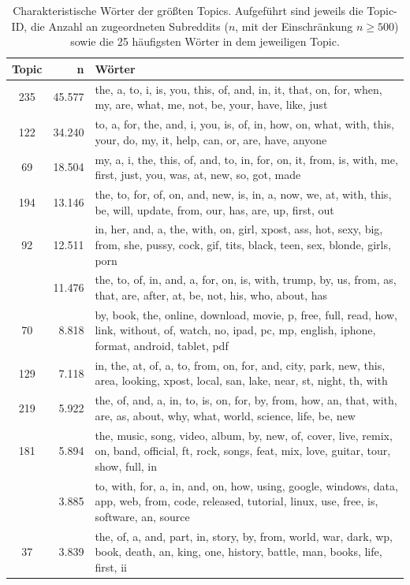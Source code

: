\documentclass[11pt,a4paper,twoside]{article}
\begin{document}
\begin{longtable}[t]{cr >{\raggedright\arraybackslash}p{\textwidth}}
\caption{\label{tab:app-top-words-tab}Charakteristische Wörter der größten Topics.
Aufgeführt sind jeweils die Topic-ID, die Anzahl an zugeordneten
Subreddits (\(n\), mit der Einschränkung \(n \ge 500\)) sowie die 25
häufigsten Wörter in dem jeweiligen Topic.}\\
\toprule
Topic & n & Wörter\\
\midrule
235 & 45.577 & the, a, to, i, is, you, this, of, and, in, it, that, on, for, when, my, are, what, me, not, be, your, have, like, just\\
122 & 34.240 & to, a, for, the, and, i, you, is, of, in, how, on, what, with, this, your, do, my, it, help, can, or, are, have, anyone\\
69 & 18.504 & my, a, i, the, this, of, and, to, in, for, on, it, from, is, with, me, first, just, you, was, at, new, so, got, made\\
194 & 13.146 & the, to, for, of, on, and, new, is, in, a, now, we, at, with, this, be, will, update, from, our, has, are, up, first, out\\
92 & 12.511 & in, her, and, a, the, with, on, girl, xpost, ass, hot, sexy, big, from, she, pussy, cock, gif, tits, black, teen, sex, blonde, girls, porn\\
\addlinespace
210 & 11.476 & the, to, of, in, and, a, for, on, is, with, trump, by, us, from, as, that, are, after, at, be, not, his, who, about, has\\
70 & 8.818 & by, book, the, online, download, movie, p, free, full, read, how, link, without, of, watch, no, ipad, pc, mp, english, iphone, format, android, tablet, pdf\\
129 & 7.118 & in, the, at, of, a, to, from, on, for, and, city, park, new, this, area, looking, xpost, local, san, lake, near, st, night, th, with\\
219 & 5.922 & the, of, and, a, in, to, is, on, for, by, from, how, an, that, with, are, as, about, why, what, world, science, life, be, new\\
181 & 5.894 & the, music, song, video, album, by, new, of, cover, live, remix, on, band, official, ft, rock, songs, feat, mix, love, guitar, tour, show, full, in\\
\addlinespace
239 & 3.885 & to, with, for, a, in, and, on, how, using, google, windows, data, app, web, from, code, released, tutorial, linux, use, free, is, software, an, source\\
37 & 3.839 & the, of, a, and, part, in, story, by, from, world, war, dark, wp, book, death, an, king, one, history, battle, man, books, life, first, ii\\

\end{longtable}
\end{document}
